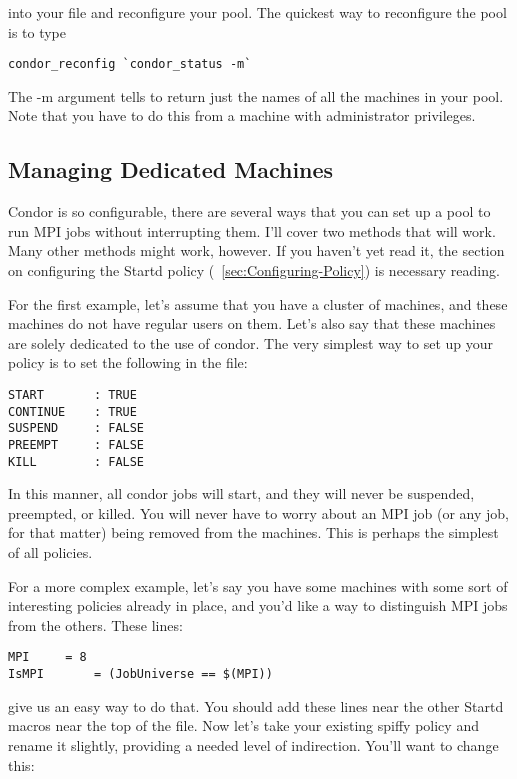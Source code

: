 into your  file and reconfigure your pool.  The quickest
way to reconfigure the pool is to type 

\begin{verbatim}
condor_reconfig `condor_status -m`
\end{verbatim}

The -m argument tells  to return just the names of all
the machines in your pool.  Note that you have to do this from a 
machine with administrator privileges.

\subsection{\label{sec:MPI-machines}Managing Dedicated Machines}

Condor is so configurable, there are several ways that you can set up
a pool to run MPI jobs without interrupting them.  I'll cover two 
methods that will work.  Many other methods might work, however.  If 
you haven't yet read it, the section on configuring the Startd policy
(~\ref{sec:Configuring-Policy}) is necessary reading.

For the first example, let's assume that you have a cluster of machines, 
and these machines do not have regular users on them.  Let's also say
that these machines are solely dedicated to the use of condor.  
The very simplest way to set up your policy is to set the following 
in the  file:

\begin{verbatim}
START       : TRUE
CONTINUE    : TRUE
SUSPEND     : FALSE
PREEMPT     : FALSE
KILL        : FALSE
\end{verbatim}

In this manner, all condor jobs will start, and they will never be
suspended, preempted, or killed.  You will never have to worry about
an MPI job (or any job, for that matter) being removed from the machines.
This is perhaps the simplest of all policies.

For a more complex example, let's say you have some machines with 
some sort of interesting policies already in place, and you'd like 
a way to distinguish MPI jobs from the others.  These lines:

\begin{verbatim}
MPI		= 8
IsMPI		= (JobUniverse == $(MPI))
\end{verbatim}

give us an easy way to do that.  You should add these lines near
the other Startd macros near the top of the  file.  
Now let's take your existing spiffy policy and rename it slightly, 
providing a needed level of indirection. You'll want to change this:

